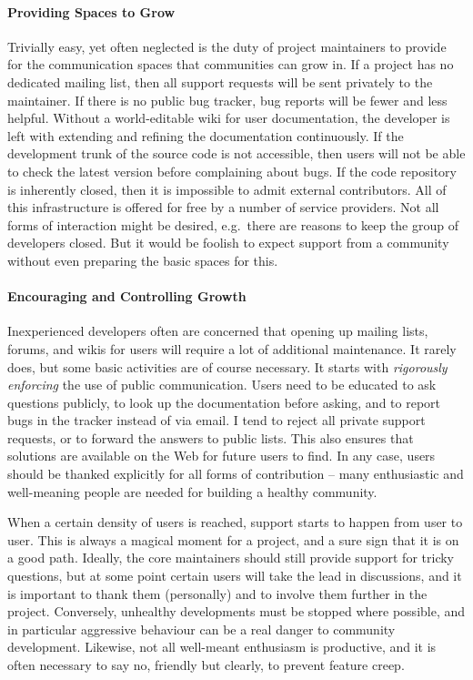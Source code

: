 \paragraph*{Providing Spaces to Grow}
Trivially easy, yet often neglected is the duty of project maintainers to
provide for the communication spaces that communities can grow in. If a project
has no dedicated mailing list, then all support requests will be sent privately
to the maintainer. If there is no public bug tracker, bug reports will be fewer
and less helpful. Without a world-editable wiki for user documentation, the
developer is left with extending and refining the documentation continuously. If
the development trunk of the source code is not accessible, then users will not
be able to check the latest version before complaining about bugs. If the code
repository is inherently closed, then it is impossible to admit external
contributors. All of this infrastructure is offered for free by a number of
service providers. Not all forms of interaction might be desired, e.g.\ there
are reasons to keep the group of developers closed. But it would be foolish to
expect support from a community without even preparing the basic spaces for
this.

\paragraph*{Encouraging and Controlling Growth}
Inexperienced developers often are concerned that opening up mailing lists,
forums, and wikis for users will require a lot of additional maintenance. It
rarely does, but some basic activities are of course necessary. It starts with
\emph{rigorously enforcing} the use of public communication. Users need to be
educated to ask questions publicly, to look up the documentation before asking,
and to report bugs in the tracker instead of via email. I tend to reject all
private support requests, or to forward the answers to public lists. This also
ensures that solutions are available on the Web for future users to find. In any
case, users should be thanked explicitly for all forms of contribution -- many
enthusiastic and well-meaning people are needed for building a healthy
community.

When a certain density of users is reached, support starts to happen from user
to user. This is always a magical moment for a project, and a sure sign that it
is on a good path. Ideally, the core maintainers should still provide support
for tricky questions, but at some point certain users will take the lead in
discussions, and it is important to thank them (personally) and to involve them
further in the project. Conversely, unhealthy developments must be stopped where
possible, and in particular aggressive behaviour can be a real danger to
community development. Likewise, not all well-meant enthusiasm is productive,
and it is often necessary to say no, friendly but clearly, to prevent feature
creep.

